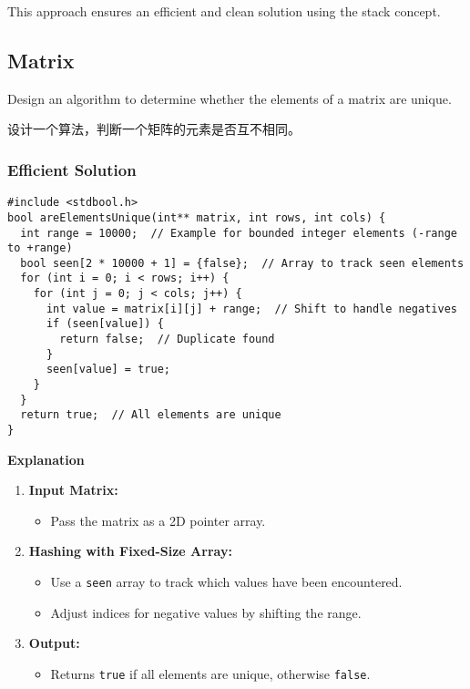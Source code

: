 \documentclass[a4paper]{article}
\begin{document}
This approach ensures an efficient and clean solution using the stack concept.

\subsection{Matrix}

Design an algorithm to determine whether the elements of a matrix are unique.

设计一个算法，判断一个矩阵的元素是否互不相同。

\subsubsection{Efficient Solution}
\begin{verbatim}
#include <stdbool.h>
bool areElementsUnique(int** matrix, int rows, int cols) {
  int range = 10000;  // Example for bounded integer elements (-range to +range)
  bool seen[2 * 10000 + 1] = {false};  // Array to track seen elements
  for (int i = 0; i < rows; i++) {
    for (int j = 0; j < cols; j++) {
      int value = matrix[i][j] + range;  // Shift to handle negatives
      if (seen[value]) {
        return false;  // Duplicate found
      }
      seen[value] = true;
    }
  }
  return true;  // All elements are unique
}
\end{verbatim}

\textbf{Explanation}

\begin{enumerate}
\item 
\textbf{Input Matrix:}
\begin{itemize}
\item 
Pass the matrix as a 2D pointer array.

\end{itemize}

\item 
\textbf{Hashing with Fixed-Size Array:}
\begin{itemize}
\item 
Use a \verb|seen| array to track which values have been encountered.

\item 
Adjust indices for negative values by shifting the range.

\end{itemize}

\item 
\textbf{Output:}
\begin{itemize}
\item 
Returns \verb|true| if all elements are unique, otherwise \verb|false|.

\end{itemize}

\end{enumerate}
\end{document}
